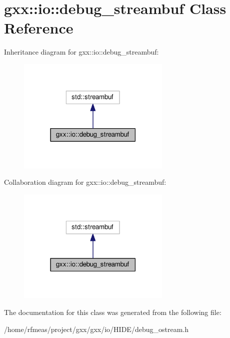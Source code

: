 \hypertarget{classgxx_1_1io_1_1debug__streambuf}{}\section{gxx\+:\+:io\+:\+:debug\+\_\+streambuf Class Reference}
\label{classgxx_1_1io_1_1debug__streambuf}


Inheritance diagram for gxx\+:\+:io\+:\+:debug\+\_\+streambuf\+:
\nopagebreak
\begin{figure}[H]
\begin{center}
\leavevmode
\includegraphics[width=207pt]{classgxx_1_1io_1_1debug__streambuf__inherit__graph}
\end{center}
\end{figure}


Collaboration diagram for gxx\+:\+:io\+:\+:debug\+\_\+streambuf\+:
\nopagebreak
\begin{figure}[H]
\begin{center}
\leavevmode
\includegraphics[width=207pt]{classgxx_1_1io_1_1debug__streambuf__coll__graph}
\end{center}
\end{figure}


The documentation for this class was generated from the following file\+:\begin{DoxyCompactItemize}
\item 
/home/rfmeas/project/gxx/gxx/io/\+H\+I\+D\+E/debug\+\_\+ostream.\+h\end{DoxyCompactItemize}
